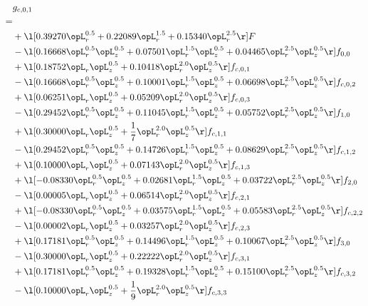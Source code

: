 \begin{alignat}{2} 
\label{eq:g_01_0} 
& g_{c,0,1} \nonumber \\ 
 = \\ 
& + \l[  0.39270 \opL_r^{0.5} +  0.22089 \opL_r^{1.5} +  0.15340 \opL_r^{2.5}  \r] F \nonumber \\ 
& - \l[  0.16668 \opL_r^{0.5} \opL_z^{0.5} +  0.07501 \opL_r^{1.5} \opL_z^{0.5} +  0.04465 \opL_r^{2.5} \opL_z^{0.5}  \r] f_{0,0} \nonumber \\ 
& + \l[  0.18752 \opL_r \opL_z^{0.5} +  0.10418 \opL_r^{2.0} \opL_z^{0.5}  \r] f_{c,0,1} \nonumber \\ 
& - \l[  0.16668 \opL_r^{0.5} \opL_z^{0.5} +  0.10001 \opL_r^{1.5} \opL_z^{0.5} +  0.06698 \opL_r^{2.5} \opL_z^{0.5}  \r] f_{c,0,2} \nonumber \\ 
& + \l[  0.06251 \opL_r \opL_z^{0.5} +  0.05209 \opL_r^{2.0} \opL_z^{0.5}  \r] f_{c,0,3} \nonumber \\ 
& - \l[  0.29452 \opL_r^{0.5} \opL_z^{0.5} +  0.11045 \opL_r^{1.5} \opL_z^{0.5} +  0.05752 \opL_r^{2.5} \opL_z^{0.5}  \r] f_{1,0} \nonumber \\ 
& + \l[  0.30000 \opL_r \opL_z^{0.5} + \frac{1}{7} \opL_r^{2.0} \opL_z^{0.5}  \r] f_{c,1,1} \nonumber \\ 
& - \l[  0.29452 \opL_r^{0.5} \opL_z^{0.5} +  0.14726 \opL_r^{1.5} \opL_z^{0.5} +  0.08629 \opL_r^{2.5} \opL_z^{0.5}  \r] f_{c,1,2} \nonumber \\ 
& + \l[  0.10000 \opL_r \opL_z^{0.5} +  0.07143 \opL_r^{2.0} \opL_z^{0.5}  \r] f_{c,1,3} \nonumber \\ 
& + \l[  -0.08330 \opL_r^{0.5} \opL_z^{0.5} +  0.02681 \opL_r^{1.5} \opL_z^{0.5} +  0.03722 \opL_r^{2.5} \opL_z^{0.5}  \r] f_{2,0} \nonumber \\ 
& - \l[  0.00005 \opL_r \opL_z^{0.5} +  0.06514 \opL_r^{2.0} \opL_z^{0.5}  \r] f_{c,2,1} \nonumber \\ 
& + \l[  -0.08330 \opL_r^{0.5} \opL_z^{0.5} +  0.03575 \opL_r^{1.5} \opL_z^{0.5} +  0.05583 \opL_r^{2.5} \opL_z^{0.5}  \r] f_{c,2,2} \nonumber \\ 
& - \l[  0.00002 \opL_r \opL_z^{0.5} +  0.03257 \opL_r^{2.0} \opL_z^{0.5}  \r] f_{c,2,3} \nonumber \\ 
& + \l[  0.17181 \opL_r^{0.5} \opL_z^{0.5} +  0.14496 \opL_r^{1.5} \opL_z^{0.5} +  0.10067 \opL_r^{2.5} \opL_z^{0.5}  \r] f_{3,0} \nonumber \\ 
& - \l[  0.30000 \opL_r \opL_z^{0.5} +  0.22222 \opL_r^{2.0} \opL_z^{0.5}  \r] f_{c,3,1} \nonumber \\ 
& + \l[  0.17181 \opL_r^{0.5} \opL_z^{0.5} +  0.19328 \opL_r^{1.5} \opL_z^{0.5} +  0.15100 \opL_r^{2.5} \opL_z^{0.5}  \r] f_{c,3,2} \nonumber \\ 
& - \l[  0.10000 \opL_r \opL_z^{0.5} + \frac{1}{9} \opL_r^{2.0} \opL_z^{0.5}  \r] f_{c,3,3} \nonumber \\ 
\end{alignat} 


